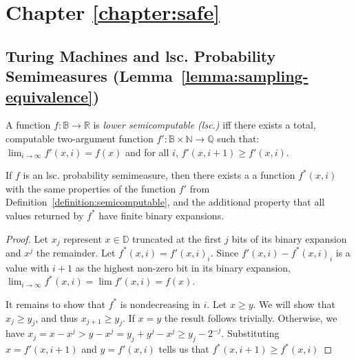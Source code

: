 \section{Chapter \ref{chapter:safe}}
\renewcommand*{\thefootnote}{\arabic{footnote}} 

\subsection{Turing Machines and lsc. Probability Semimeasures (Lemma~\ref{lemma:sampling-equivalence})} 
\begin{definition}
A function $f : {\mathbb B} \rightarrow {\mathbb R}$ is \emph{lower semicomputable (lsc.)} iff there exists a total, computable two-argument function $f': {\mathbb B} \times {\mathbb N} \rightarrow \mathbb Q$ such that: $\lim_{i \rightarrow \infty} f'(x, i) = f(x)$ and  for all $i$, $f'(x, i + 1) \geq f'(x, i)$.
\label{definition:semicomputable}
\end{definition}

\begin{lemma}
If $f$ is an lsc. probability semimeasure, then there exists a a function $f^*(x, i)$ with the same properties of the function $f'$ from Definition~\ref{definition:semicomputable}, and the additional property that all values returned by $f^*$ have finite binary expansions.
\label{lemma:f-star}
\end{lemma}
\begin{proof}
Let $x_j$ represent $x \in {\mathbb D}$ truncated at the first $j$ bits of its binary expansion and $x^j$ the remainder. Let $f^*(x, i) = f'(x, i)_i$. Since $f'(x, i) - f^*(x, i)_i$ is a value with $i+1$ as the highest non-zero bit in its binary expansion, $\lim_{i\rightarrow \infty} f^*(x, i) = \lim f'(x, i) = f(x)$.
 
It remains to show that $f^*$ is nondecreasing in $i$. Let $x \geq y$. We will show that $x_j \geq y_j$, and thus $x_{j+1} \geq y_j$. If $x = y$ the result follows trivially. Otherwise, we have $x_j = x - x^j > y - x^j = y_j + y ^j - x^j \geq y_j - 2^{-j}$. Substituting $x = f'(x, i+1)$ and $y = f'(x,i)$ tells us that $f^*(x, i+1) \geq f^*(x, i)$
\end{proof}

